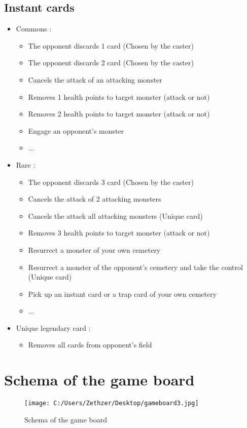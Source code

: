 \documentclass[a4paper,12pt]{book}
\begin{document}
\subsection{Instant cards}
\begin{itemize}
	\item Commons :
	\begin{itemize}
		\item The opponent discards 1 card (Chosen by the caster)
		\item The opponent discards 2 card (Chosen by the caster)
		\item Cancels the attack of an attacking monster
		\item Removes 1 health points to target monster (attack or not)
		\item Removes 2 health points to target monster (attack or not)
		\item Engage an opponent's monster
		\item ...
	\end{itemize}
	\item Rare :
	\begin{itemize}
		\item The opponent discards 3 card (Chosen by the caster)
		\item Cancels the attack of 2 attacking monsters
		\item Cancels the attack all attacking monsters (Unique card)
		\item Removes 3 health points to target monster (attack or not)
		\item Resurrect a monster of your own cemetery
		\item Resurrect a monster of the opponent's cemetery and take the control (Unique card)
		\item Pick up an instant card or a trap card of your own cemetery
		\item ...
	\end{itemize}
	\item Unique legendary card :
	\begin{itemize}
		\item Removes all cards from opponent's field
	\end{itemize}
\end{itemize}
\newpage
\section{Schema of the game board}
\begin{figure}[ht]
	\centering
	\texttt{[image: C:/Users/Zethzer/Desktop/gameboard3.jpg]}
	\caption{Schema of the game board}
	\label{fig:gameboard}
\end{figure}
\end{document}
